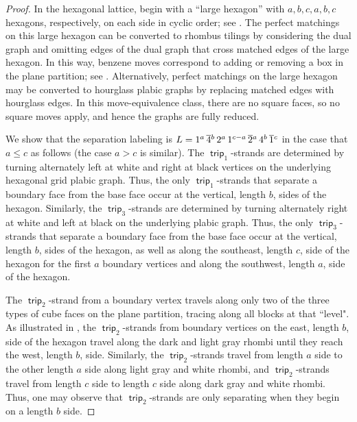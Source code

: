 \documentclass{amsart}
\theoremstyle{definition}
\theoremstyle{remark}
\numberwithin{equation}{section}
\DeclareMathOperator{\trip}{\mathsf{trip}}
\begin{document}
\begin{proof}
  In the hexagonal lattice, begin with a ``large hexagon''  with $a, b, c, a, b, c$ hexagons, respectively, on each side in cyclic order; see . The perfect matchings on this large hexagon can be converted to rhombus tilings by considering the dual graph and omitting edges of the dual graph that cross matched edges of the large hexagon. In this way, benzene moves correspond to adding or removing a box in the plane partition; see . Alternatively, perfect matchings on the large hexagon may be converted to hourglass plabic graphs by replacing matched edges with hourglass edges. In this move-equivalence class, there are no square faces, so no square moves apply, and hence the graphs are fully reduced.
  
  We show that the separation labeling is $L = 1^a \, \overline{4}\vphantom{4}^b \, 2^a \, 1^{c-a} \, \overline{2}\vphantom{2}^a \, 4^b \, \overline{1}\vphantom{1}^c$ in the case that $a \leq c$ as follows (the case $a>c$ is similar). The $\trip_1$-strands are determined by turning alternately left at white and right at black vertices on the underlying hexagonal grid plabic graph. Thus, the only $\trip_1$-strands that separate a boundary face from the base face occur at the vertical, length $b$, sides of the hexagon. Similarly, the $\trip_3$-strands are determined by turning alternately right at white and left at black on the underlying plabic graph. Thus, the only $\trip_3$-strands that separate a boundary face from the base face occur at the vertical, length $b$, sides of the hexagon, as well as along the southeast, length $c$, side of the hexagon for the first $a$ boundary vertices and along the southwest, length $a$, side of the hexagon.

  The $\trip_2$-strand from a boundary vertex travels along only two of the three types of cube faces on the plane partition, tracing along all blocks at that ``level". As illustrated in , the $\trip_2$-strands from boundary vertices on the east, length $b$, side of the hexagon travel along the dark and light gray rhombi until they reach the west, length $b$, side. Similarly, the $\trip_2$-strands travel from length $a$ side to the other length $a$ side along light gray and white rhombi, and $\trip_2$-strands travel from length $c$ side to length $c$ side along dark gray and white rhombi. Thus, one may observe that $\trip_2$-strands are only separating when they begin on a length $b$ side.
\end{proof}
\end{document}
